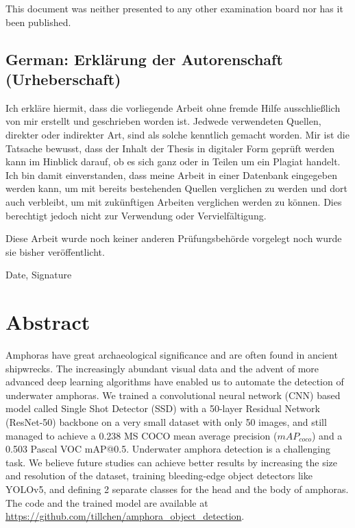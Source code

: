 \documentclass[a4paper, 11pt, oneside]{article}
\begin{document}
  This document was neither presented to any other examination board
  nor has it been published.

  \subsection*{German: Erklärung der Autorenschaft (Urheberschaft)}

  Ich erkläre hiermit, dass die vorliegende Arbeit ohne fremde Hilfe
  ausschließlich von mir erstellt und geschrieben worden ist. Jedwede
  verwendeten Quellen, direkter oder indirekter Art, sind als solche
  kenntlich gemacht worden. Mir ist die Tatsache bewusst, dass der
  Inhalt der Thesis in digitaler Form geprüft werden kann im Hinblick
  darauf, ob es sich ganz oder in Teilen um ein Plagiat handelt. Ich
  bin damit einverstanden, dass meine Arbeit in einer Datenbank
  eingegeben werden kann, um mit bereits bestehenden Quellen
  verglichen zu werden und dort auch verbleibt, um mit zukünftigen
  Arbeiten verglichen werden zu können. Dies berechtigt jedoch nicht
  zur Verwendung oder Vervielfältigung.

  Diese Arbeit wurde noch keiner anderen Prüfungsbehörde vorgelegt
  noch wurde sie bisher veröffentlicht.

  \vspace{20mm}

  Date, Signature

  \newpage

  \section*{Abstract}

  Amphoras have great archaeological significance and are often found in ancient shipwrecks. The increasingly abundant
  visual data and the advent of more advanced deep learning algorithms have enabled us to automate the detection of
  underwater amphoras. We trained a convolutional neural network (CNN) based model called Single Shot Detector (SSD) with
  a 50-layer Residual Network (ResNet-50) backbone on a very small dataset with only 50 images, and still managed to
  achieve a 0.238 MS COCO mean average precision ($mAP_{coco}$) and a 0.503 Pascal VOC mAP@0.5. Underwater amphora
  detection is a challenging task. We believe future studies can achieve better results by increasing the size and
  resolution of the dataset, training bleeding-edge object detectors like YOLOv5, and defining 2 separate classes for
  the head and the body of amphoras. The code and the trained model are available at
  \url{https://github.com/tillchen/amphora_object_detection}.
\end{document}
